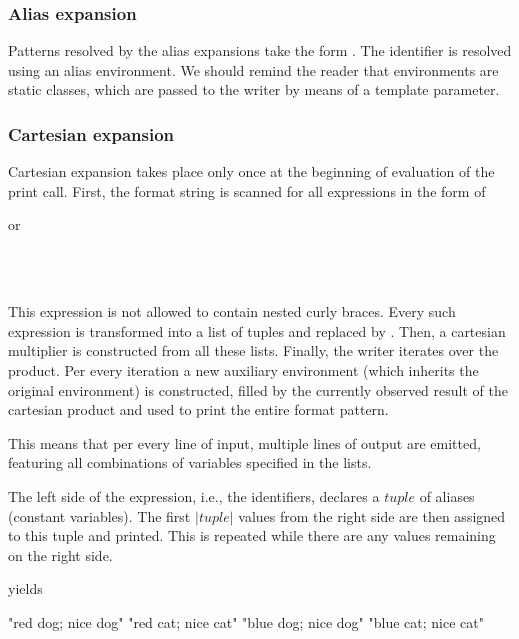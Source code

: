 \subsubsection{Alias expansion}

Patterns resolved by the alias expansions take the form \ttt{\$<[a-zA-Z]+>}. The identifier is resolved using an alias environment. We should remind the reader that environments are static classes, which are passed to the writer by means of a template parameter.


\subsubsection{Cartesian expansion}
Cartesian expansion takes place only once at the beginning of evaluation of the print call. First, the format string is scanned for all expressions in the form of \\ \centerline{ or} \\ \centerline{} \\ This expression is not allowed to contain nested curly braces. Every such expression is transformed into a list of tuples and replaced by .  Then, a cartesian multiplier is constructed from all these lists. Finally, the writer iterates over the product. Per every iteration a new auxiliary environment (which inherits the original environment) is constructed, filled by the currently observed result of the cartesian product and used to print the entire format pattern.

This means that per every line of input, multiple lines of output are emitted, featuring all combinations of variables specified in the lists.

The left side of the expression, i.e., the identifiers, declares a $tuple$ of aliases (constant variables). The first $|tuple|$ values from the right side are then assigned to this tuple and printed. This is repeated while there are any values remaining on the right side.

\mybeginfig
{}
yields
\begin{code}
"red dog; nice dog"
"red cat; nice cat"
"blue dog; nice dog"
"blue cat; nice cat"
\end{code}

